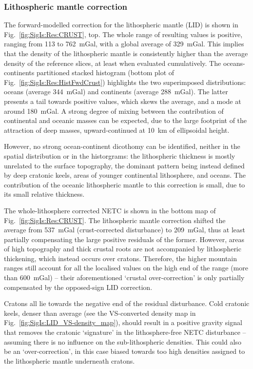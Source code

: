 \subsubsection{Lithospheric mantle correction}
\label{sss:SigIs:Results:Maps:LID}
The forward-modelled correction for the lithospheric mantle (LID) is shown in Fig.~\ref{fig:SigIs:Res:CRUST}, top.
The whole range of resulting values is positive, ranging from \num{113} to \SI{762}{mGal}, with a global average of \SI{329}{mGal}.
This implies that the density of the lithospheric mantle is consistently higher than the average density of the reference slices, at least when evaluated cumulatively.
The oceans-continents partitioned stacked histogram (bottom plot of Fig.~\ref{fig:SigIs:Res:HistFwdCrust}) highlights the two superimposed distributions: oceans (average \SI{344}{mGal}) and continents (average \SI{288}{mGal}). The latter presents a tail towards positive values, which skews the average, and a mode at around \SI{180}{mGal}.
A strong degree of mixing between the contribution of continental and oceanic masses can be expected, due to the large footprint of the attraction of deep masses, upward-continued at \SI{10}{\kilo \metre} of ellipsoidal height.

However, no strong ocean-continent dicothomy can be identified, neither in the spatial distribution or in the historgrams: the lithospheric thickness is mostly unrelated to the surface topography, the dominant pattern being instead defined by deep cratonic keels, areas of younger continental lithosphere, and oceans.
The contribution of the oceanic lithospheric mantle to this correction is small, due to its small relative thickness.

The whole-lithosphere corrected NETC is shown in the bottom map of Fig.~\ref{fig:SigIs:Res:CRUST}.
The lithospheric mantle correction shifted the average from \SI{537}{mGal} (crust-corrected disturbance) to \SI{209}{mGal}, thus at least partially compensating the large positive residuals of the former.
However, areas of high topography and thick crustal roots are not accompanied by lithospheric thickening, which instead occurs over cratons.
Therefore, the higher mountain ranges still account for all the localised values on the high end of the range (more than \SI{600}{mGal}) -- their aforementioned `crustal over-correction' is only partially compensated by the opposed-sign LID correction.

Cratons all lie towards the negative end of the residual disturbance.
Cold cratonic keels, denser than average (see the VS-converted density map in Fig.~\ref{fig:SigIs:LID_VS-density_map}), should result in a positive gravity signal that removes the cratonic `signature' in the lithosphere-free NETC disturbance -- assuming there is no influence on the sub-lithospheric densities.
This could also be an `over-correction', in this case biased towards too high densities assigned to the lithospheric mantle underneath cratons.

